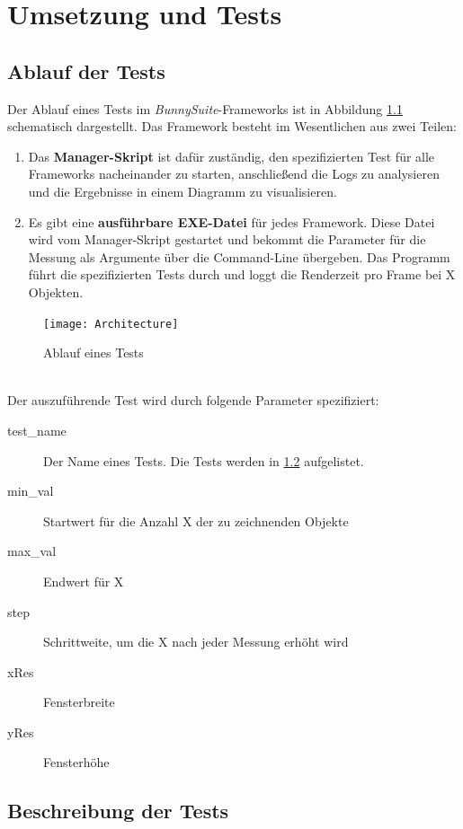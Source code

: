 \chapter{Umsetzung und Tests}

\section{Ablauf der Tests}
Der Ablauf eines Tests im \textit{BunnySuite}-Frameworks ist in Abbildung \ref{dia:architecture} schematisch dargestellt. Das Framework besteht im Wesentlichen aus zwei Teilen:
\begin{enumerate}
\item Das \textbf{Manager-Skript} ist dafür zuständig, den spezifizierten Test für alle Frameworks nacheinander zu starten, anschließend die Logs zu analysieren und die Ergebnisse in einem Diagramm zu visualisieren.
\item Es gibt eine \textbf{ausführbare EXE-Datei} für jedes Framework. Diese Datei wird vom Manager-Skript gestartet und bekommt die Parameter für die Messung als Argumente über die Command-Line übergeben. Das Programm führt die spezifizierten Tests durch und loggt die Renderzeit pro Frame bei X Objekten.
\end{enumerate}
\begin{figure}[h]
\caption{Ablauf eines Tests}
\centering
\texttt{[image: Architecture]}
\label{dia:architecture}
\end{figure}
~\\
Der auszuführende Test wird durch folgende Parameter spezifiziert:\\
\begin{description}
\item[test\_name] Der Name eines Tests. Die Tests werden in \ref{sec:tests} aufgelistet.
\item[min\_val] Startwert für die Anzahl X der zu zeichnenden Objekte
\item[max\_val] Endwert für X
\item[step] Schrittweite, um die X nach jeder Messung erhöht wird
\item[xRes] Fensterbreite
\item[yRes] Fensterhöhe
\end{description}

\section{Beschreibung der Tests}
\label{sec:tests}

